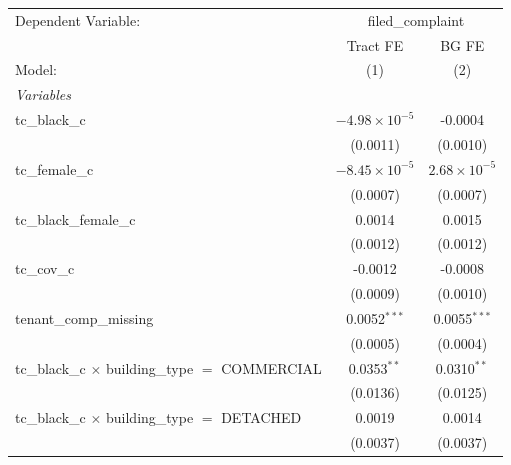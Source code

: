 \begin{tabular}{lcc}
   \tabularnewline \midrule \midrule
   Dependent Variable: & \multicolumn{2}{c}{filed\_complaint}\\
                                                                       & Tract FE               & BG FE \\   
   Model:                                                              & (1)                    & (2)\\  
   \midrule
   \emph{Variables}\\
   tc\_black\_c                                                        & $-4.98\times 10^{-5}$  & -0.0004\\   
                                                                       & (0.0011)               & (0.0010)\\   
   tc\_female\_c                                                       & $-8.45\times 10^{-5}$  & $2.68\times 10^{-5}$\\    
                                                                       & (0.0007)               & (0.0007)\\   
   tc\_black\_female\_c                                                & 0.0014                 & 0.0015\\   
                                                                       & (0.0012)               & (0.0012)\\   
   tc\_cov\_c                                                          & -0.0012                & -0.0008\\   
                                                                       & (0.0009)               & (0.0010)\\   
   tenant\_comp\_missing                                               & 0.0052$^{***}$         & 0.0055$^{***}$\\   
                                                                       & (0.0005)               & (0.0004)\\   
   tc\_black\_c $\times$ building\_type $=$ COMMERCIAL                 & 0.0353$^{**}$          & 0.0310$^{**}$\\   
                                                                       & (0.0136)               & (0.0125)\\   
   tc\_black\_c $\times$ building\_type $=$ DETACHED                   & 0.0019                 & 0.0014\\   
                                                                       & (0.0037)               & (0.0037)\\   

\end{tabular}

